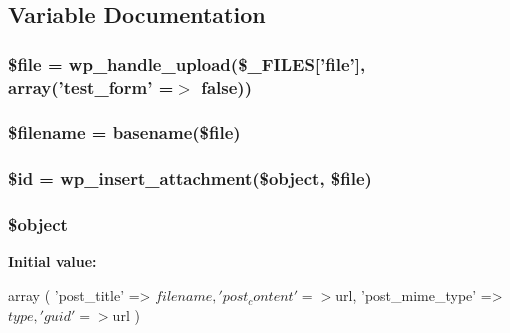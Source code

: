 \subsection{Variable Documentation}
\hypertarget{contact__ajax_8php_aa1bfbd27060176201b271918dff57e8f}{
\subsubsection[{\$file}]{\setlength{\rightskip}{0pt plus 5cm}\$file = wp\_\-handle\_\-upload(\$\_\-FILES\mbox{[}'file'\mbox{]}, array('test\_\-form' =$>$ false))}}
\label{d6/d22/contact__ajax_8php_aa1bfbd27060176201b271918dff57e8f}
\hypertarget{contact__ajax_8php_a0722441477f957078ee2437054556cbc}{
\subsubsection[{\$filename}]{\setlength{\rightskip}{0pt plus 5cm}\$filename = basename(\$file)}}
\label{d6/d22/contact__ajax_8php_a0722441477f957078ee2437054556cbc}
\hypertarget{contact__ajax_8php_ae97941710d863131c700f069b109991e}{
\subsubsection[{\$id}]{\setlength{\rightskip}{0pt plus 5cm}\$id = wp\_\-insert\_\-attachment(\$object, \$file)}}
\label{d6/d22/contact__ajax_8php_ae97941710d863131c700f069b109991e}
\hypertarget{contact__ajax_8php_a52123b83a1952a68c5513e47d59ec4a6}{
\subsubsection[{\$object}]{\setlength{\rightskip}{0pt plus 5cm}\$object}}
\label{d6/d22/contact__ajax_8php_a52123b83a1952a68c5513e47d59ec4a6}
{\bfseries Initial value:}
\begin{DoxyCode}
 
    array
    (
        'post_title' => $filename,
        'post_content' => $url,
        'post_mime_type' => $type,
        'guid' => $url
    )
\end{DoxyCode}

